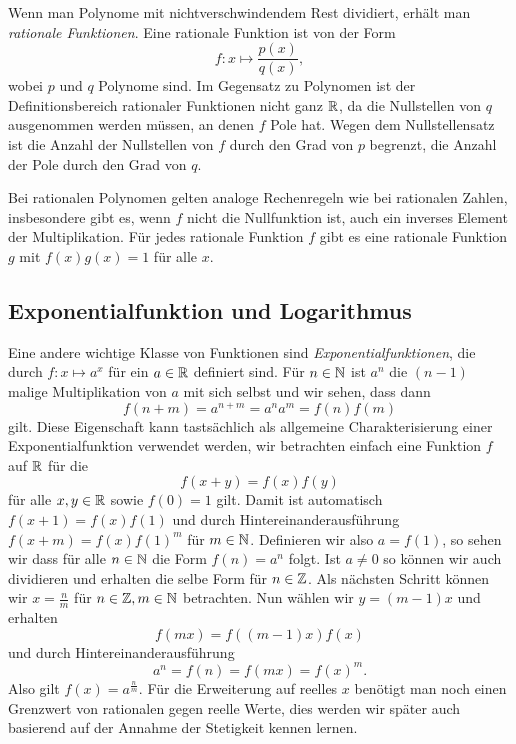 Wenn man Polynome mit nichtverschwindendem Rest dividiert, erhält man \emph{rationale Funktionen}.
Eine rationale Funktion ist von der Form
\begin{equation*}
 f:x\mapsto  \frac{p(x)}{q(x)},\end{equation*}
wobei \(p\) und \(q\) Polynome sind. Im Gegensatz zu Polynomen ist der Definitionsbereich rationaler Funktionen nicht ganz \(\mathbb{R}\), da die Nullstellen von \(q\) ausgenommen werden müssen, an denen \(f\) Pole hat. Wegen dem Nullstellensatz ist die Anzahl der Nullstellen von \(f\) durch den Grad von \(p\) begrenzt, die Anzahl der Pole durch den Grad von \(q\).

Bei rationalen Polynomen gelten analoge Rechenregeln wie bei rationalen Zahlen, insbesondere gibt es, wenn \(f\) nicht die Nullfunktion ist, auch ein inverses Element der Multiplikation. Für jedes rationale Funktion \(f\) gibt es eine rationale Funktion \(g\) mit \(f(x) g(x) = 1\) für alle \(x\).


\subsection{Exponentialfunktion und Logarithmus}
\label{\detokenize{vorkurs/funktionen:exponentialfunktion-und-logarithmus}}
Eine andere wichtige Klasse von Funktionen sind \emph{Exponentialfunktionen}, die durch \(f: x\mapsto a^x\) für ein \(a \in \mathbb{R}\) definiert sind. Für \(n \in \mathbb{N}\) ist \(a^n\) die \((n-1)\) malige Multiplikation von \(a\) mit sich selbst und wir sehen, dass dann
\begin{equation*}
 f(n+m) = a^{n+m}  = a^n a^m  = f(n) f(m)\end{equation*}
gilt. Diese Eigenschaft kann tastsächlich als allgemeine Charakterisierung einer Exponentialfunktion verwendet werden, wir betrachten einfach eine Funktion \(f\) auf \(\mathbb{R}\) für die
\begin{equation*}
 f(x+y) =  f(x) f(y)\end{equation*}
für alle \(x,y \in \mathbb{R}\) sowie \(f(0)=1\)
gilt. Damit ist automatisch \(f(x+1) = f(x) f(1)\) und durch Hintereinanderausführung \(f(x+m) = f(x) f(1)^m\) für \(m \in \mathbb{N}\). Definieren wir also \(a=f(1)\), so sehen wir dass für alle \(n \in \mathbb{N}\) die Form \(f(n) = a^n\) folgt. Ist \(a \neq 0\) so können wir auch dividieren und erhalten die selbe Form für \(n \in \mathbb{Z}\). Als nächsten Schritt können wir \(x= \frac{n}m\) für \(n \in \mathbb{Z}, m \in \mathbb{N}\) betrachten. Nun wählen wir \(y=(m-1) x\) und erhalten
\begin{equation*}
 f(m x) = f((m-1)x) f(x)\end{equation*}
und durch Hintereinanderausführung
\begin{equation*}
 a^n = f(n) = f(mx) = f(x)^m.\end{equation*}
Also gilt \(f(x) = a^{\frac{n}m}. \) Für die Erweiterung auf reelles \(x\) benötigt man noch einen Grenzwert von rationalen gegen reelle Werte, dies werden wir später auch basierend auf der Annahme der Stetigkeit kennen lernen.

